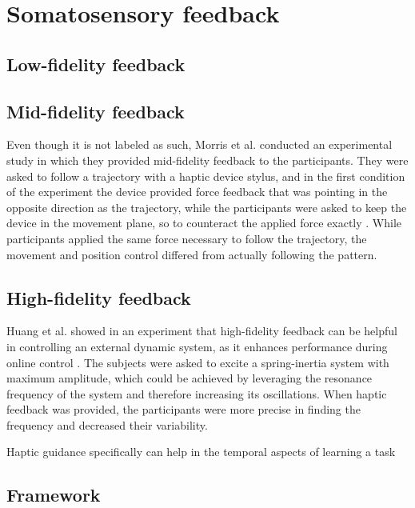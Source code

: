 \section{Somatosensory feedback}
\subsection{Low-fidelity feedback}

\subsection{Mid-fidelity feedback}
Even though it is not labeled as such, Morris et al. conducted an experimental study in which they provided mid-fidelity feedback to the participants. They were asked to follow a trajectory with a haptic device stylus, and in the first condition of the experiment the device provided force feedback that was pointing in the opposite direction as the trajectory, while the participants were asked to keep the device in the movement plane, so to counteract the applied force exactly \cite{Morris2007}. While participants applied the same force necessary to follow the trajectory, the movement and position control differed from actually following the pattern.



\subsection{High-fidelity feedback}
Huang et al. showed in an experiment that high-fidelity feedback can be helpful in controlling an external dynamic system, as it enhances performance during online control \cite{Huang2007}. The subjects were asked to excite a spring-inertia system with maximum amplitude, which could be achieved by leveraging the resonance frequency of the system and therefore increasing its oscillations. When haptic feedback was provided, the participants were more precise in finding the frequency and decreased their variability.

Haptic guidance specifically can help in the temporal aspects of learning a task \cite{Feygin2002HapticSkill} 

\subsection{Framework}

